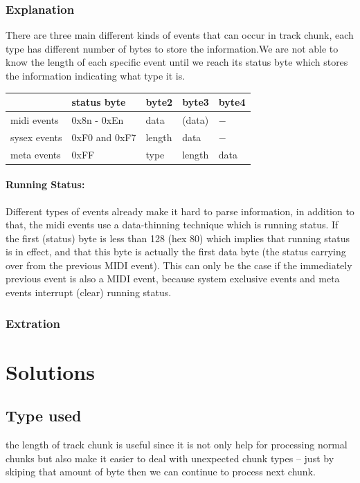 \documentclass[12.5pt]{scrartcl}
\begin{document}
\subsubsection{Explanation}
There are three main different kinds of events that can occur in track chunk, each type has different number of bytes to store the information.We are not able to know the length of each specific event until we reach its status byte which stores the information indicating what type it is.
\begin{center}
	\begin{tabu}{|l|m{7em}|m{4em}|m{4em}|m{4em}|}
	    \hline
	    & status byte & byte2 & byte3 & byte4 \\
        \hline
		midi events & 0x8n - 0xEn & data & (data) & $-$\\ 
		\hline
		sysex events & 0xF0 and 0xF7 & length & data & $-$\\  
		\hline
		meta events & 0xFF & type & length & data \\  
		\hline
	\end{tabu}
\end{center}
\paragraph{Running Status: }
Different types of events already make it hard to parse information, in addition to that, the midi events use  a data-thinning technique which is running status.
If the first (status) byte is less than 128 (hex 80) which implies that running status is in effect, and that this byte is actually the first data byte (the status carrying over from the previous MIDI event). This can only be the case if the immediately previous event is also a MIDI event, because system exclusive events and meta events interrupt (clear) running status.

\subsubsection{Extration}

\section{Solutions}
\subsection{Type used}
the length of track chunk is useful since it is not only help for processing normal chunks but also make it easier to deal with unexpected chunk types -- just by skiping that amount of byte then we can continue to process next chunk.
\end{document}
